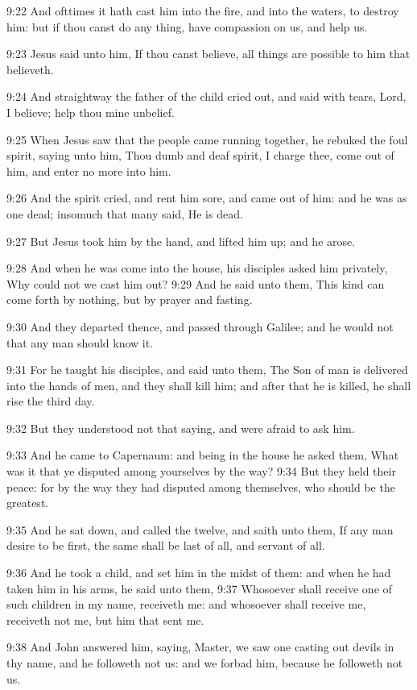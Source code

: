 9:22 And ofttimes it hath cast him into the fire, and into the waters, to destroy him: but if thou canst do any thing, have compassion on us, and help us.

9:23 Jesus said unto him, If thou canst believe, all things are possible to him that believeth.

9:24 And straightway the father of the child cried out, and said with tears, Lord, I believe; help thou mine unbelief.

9:25 When Jesus saw that the people came running together, he rebuked the foul spirit, saying unto him, Thou dumb and deaf spirit, I charge thee, come out of him, and enter no more into him.

9:26 And the spirit cried, and rent him sore, and came out of him: and he was as one dead; insomuch that many said, He is dead.

9:27 But Jesus took him by the hand, and lifted him up; and he arose.

9:28 And when he was come into the house, his disciples asked him privately, Why could not we cast him out?  9:29 And he said unto them, This kind can come forth by nothing, but by prayer and fasting.

9:30 And they departed thence, and passed through Galilee; and he would not that any man should know it.

9:31 For he taught his disciples, and said unto them, The Son of man is delivered into the hands of men, and they shall kill him; and after that he is killed, he shall rise the third day.

9:32 But they understood not that saying, and were afraid to ask him.

9:33 And he came to Capernaum: and being in the house he asked them, What was it that ye disputed among yourselves by the way?  9:34 But they held their peace: for by the way they had disputed among themselves, who should be the greatest.

9:35 And he sat down, and called the twelve, and saith unto them, If any man desire to be first, the same shall be last of all, and servant of all.

9:36 And he took a child, and set him in the midst of them: and when he had taken him in his arms, he said unto them, 9:37 Whosoever shall receive one of such children in my name, receiveth me: and whosoever shall receive me, receiveth not me, but him that sent me.

9:38 And John answered him, saying, Master, we saw one casting out devils in thy name, and he followeth not us: and we forbad him, because he followeth not us.

